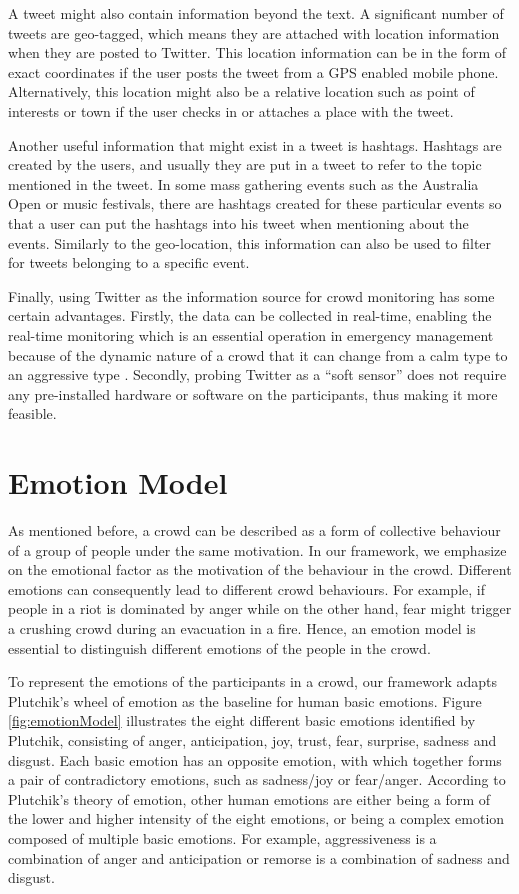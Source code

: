 A tweet might also contain information beyond the text. A significant number of tweets are geo-tagged, which means they are attached with location information when they are posted to Twitter. This location information can be in the form of exact coordinates if the user posts the tweet from a GPS enabled mobile phone. Alternatively, this location might also be a relative location such as point of interests or town if the user checks in or attaches a place with the tweet.

Another useful information that might exist in a tweet is hashtags. Hashtags are created by the users, and usually they are put in a tweet to refer to the topic mentioned in the tweet. In some mass gathering events such as the Australia Open or music festivals, there are hashtags created for these particular events so that a user can put the hashtags into his tweet when mentioning about the events. Similarly to the geo-location, this information can also be used to filter for tweets belonging to a specific event.

Finally, using Twitter as the information source for crowd monitoring has some certain advantages. Firstly, the data can be collected in real-time, enabling the real-time monitoring which is an essential operation in emergency management because of the dynamic nature of a crowd that it can change from a calm type to an aggressive type \citep{Berlonghi1995}. Secondly, probing Twitter as a ``soft sensor'' does not require any pre-installed hardware or software on the participants, thus making it more feasible.

\section{Emotion Model}

As mentioned before, a crowd can be described as a form of collective behaviour of a group of people under the same motivation. In our framework, we emphasize on the emotional factor as the motivation of the behaviour in the crowd. Different emotions can consequently lead to different crowd behaviours. For example, if people in a riot is dominated by anger while on the other hand, fear might trigger a crushing crowd during an evacuation in a fire. Hence, an emotion model is essential to distinguish different emotions of the people in the crowd.

To represent the emotions of the participants in a crowd, our framework adapts Plutchik's wheel of emotion as the baseline for human basic emotions. Figure \ref{fig:emotionModel} illustrates the eight different basic emotions identified by Plutchik, consisting of anger, anticipation, joy, trust, fear, surprise, sadness and disgust. Each basic emotion has an opposite emotion, with which together forms a pair of contradictory emotions, such as sadness/joy or fear/anger. According to Plutchik's theory of emotion, other human emotions are either being a form of the lower and higher intensity of the eight emotions, or being a complex emotion composed of multiple basic emotions. For example, aggressiveness is a combination of anger and anticipation or remorse is a combination of sadness and disgust.

